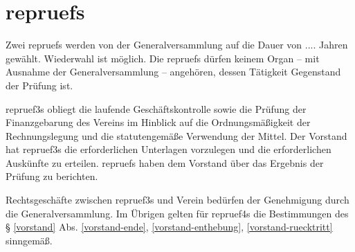 \documentclass{article}
\begin{document}
\section{\glspl{repruef}}\label{rechnungspruefung}
\begin{absatz}
    \item Zwei \glspl{repruef} werden von der Generalversammlung auf die Dauer von
    .... Jahren gewählt. Wiederwahl ist möglich. Die \glspl{repruef} dürfen keinem Organ – mit Ausnahme der Generalversammlung – angehören, dessen Tätigkeit Gegenstand der Prüfung ist.
    \item \Glspl{repruef3} obliegt die laufende Geschäftskontrolle sowie die Prüfung der Finanzgebarung des Vereins im Hinblick auf die Ordnungsmäßigkeit der Rechnungslegung und die statutengemäße Verwendung der Mittel. Der Vorstand hat \glspl{repruef3} die erforderlichen Unterlagen vorzulegen und die erforderlichen Auskünfte zu erteilen. \Glspl{repruef} haben dem Vorstand über das Ergebnis der Prüfung zu berichten.
    \item Rechtsgeschäfte zwischen \glspl{repruef3} und Verein bedürfen der Genehmigung durch die Generalversammlung. Im Übrigen gelten für \glspl{repruef4} die Bestimmungen des § \ref{vorstand} Abs. \ref{vorstand-ende}, \ref{vorstand-enthebung}, \ref{vorstand-ruecktritt} sinngemäß.
\end{absatz}
\end{document}
